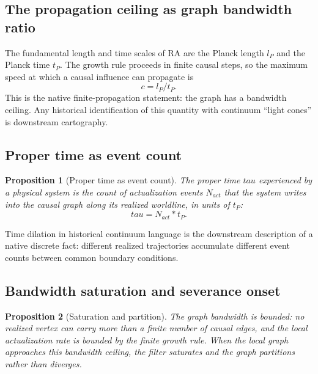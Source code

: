\documentclass[11pt]{article}
\def\ell{l}%
\def\tau{tau}%
\def\mathrm#1{#1}%
\def\frac#1#2{#1/#2}%
\def\cdot{*}%
\newtheorem{proposition}{Proposition}
\begin{document}
\subsection{The propagation ceiling as graph bandwidth ratio}

The fundamental length and time scales of RA are the Planck length $\ell_P$ and the Planck time $t_P$. The growth rule proceeds in finite causal steps, so the maximum speed at which a causal influence can propagate is
\begin{equation}
\label{eq:c_bandwidth}
\boxed{c = \frac{\ell_P}{t_P}.}
\end{equation}
This is the native finite-propagation statement: the graph has a bandwidth ceiling. Any historical identification of this quantity with continuum ``light cones'' is downstream cartography.

\subsection{Proper time as event count}

\begin{proposition}[Proper time as event count]
\label{prop:proper_time}
The proper time $\tau$ experienced by a physical system is the count of actualization events $N_{\mathrm{act}}$ that the system writes into the causal graph along its realized worldline, in units of $t_P$:
\begin{equation}
\tau = N_{\mathrm{act}} \cdot t_P.
\end{equation}
\end{proposition}

Time dilation in historical continuum language is the downstream description of a native discrete fact: different realized trajectories accumulate different event counts between common boundary conditions.

\subsection{Bandwidth saturation and severance onset}

\begin{proposition}[Saturation and partition]
\label{prop:singularity}
The graph bandwidth is bounded: no realized vertex can carry more than a finite number of causal edges, and the local actualization rate is bounded by the finite growth rule. When the local graph approaches this bandwidth ceiling, the filter saturates and the graph partitions rather than diverges.
\end{proposition}
\end{document}
